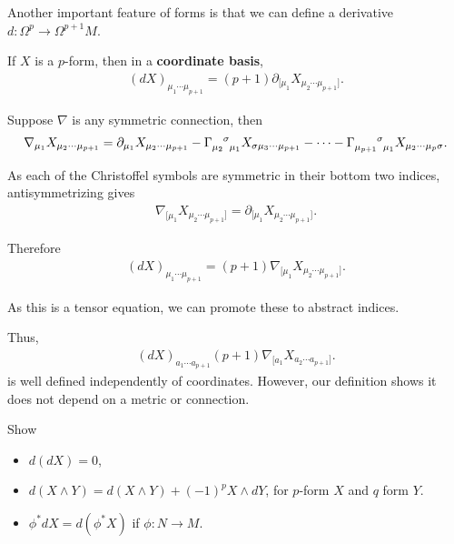 Another important feature of forms is that we can define a derivative $d : \Omega^{p} \to \Omega^{p+1}M$.
\begin{definition}
    If $X$ is a $p$-form, then in a \textbf{coordinate basis},
    \begin{align}
        \left( dX \right)_{\mu_1 \cdots \mu_{p+1}} = \left( p + 1 \right) \partial_{[\mu_1} X_{\mu_{2} \cdots \mu_{p+1}]}
    .\end{align}
\end{definition}

Suppose $\nabla$ is any symmetric connection, then
\begin{align}
    \nabla_{\mu_1} X_{\mu_2 \cdots \mu_{p+1}} = \partial_{\mu_1} X_{\mu_2 \cdots \mu_{p +1}} - \tensor{\Gamma}{_{\mu_2}^{\sigma}_{\mu_1}} X_{\sigma \mu_3 \cdots \mu_{p+1}} - \cdots - \tensor{\Gamma}{_{\mu_{p+1}}^{\sigma}_{\mu_1}} X_{\mu_2 \cdots \mu_p \sigma}
.\end{align}

As each of the Christoffel symbols are symmetric in their bottom two indices, antisymmetrizing gives
\begin{align}
    \nabla_{[\mu_1} X_{\mu_2 \cdots \mu_{p+1}]} = \partial_{[\mu_1} X_{\mu_2 \cdots \mu_{p+1}]}
.\end{align}

Therefore
\begin{align}
    \left( dX \right)_{\mu_1 \cdots \mu_{p+1}} = \left( p + 1 \right) \nabla_{[\mu_1} X_{\mu_2 \cdots \mu_{p+1}]}
.\end{align}

As this is a tensor equation, we can promote these to abstract indices.

Thus,
\begin{align}
    \left( dX \right)_{a_1 \cdots a_{p + 1}} \left( p + 1 \right) \nabla_{[a_1} X_{a_2 \cdots a_{p+1}]}
.\end{align}
is well defined independently of coordinates. However, our definition shows it does not depend on a metric or connection.


\begin{exercise}
Show
    \begin{itemize}
        \item $d \left( d X \right) = 0$,
        \item $d \left( X \wedge Y \right) = d \left( X \wedge Y \right) + \left( -1 \right)^{p} X \wedge d Y$, for $p$-form $X$ and $q$ form $Y$.
        \item $\phi^{*} d X = d \left( \phi^{*}X \right) $ if $\phi : N \to M$.
    \end{itemize}
\end{exercise}


